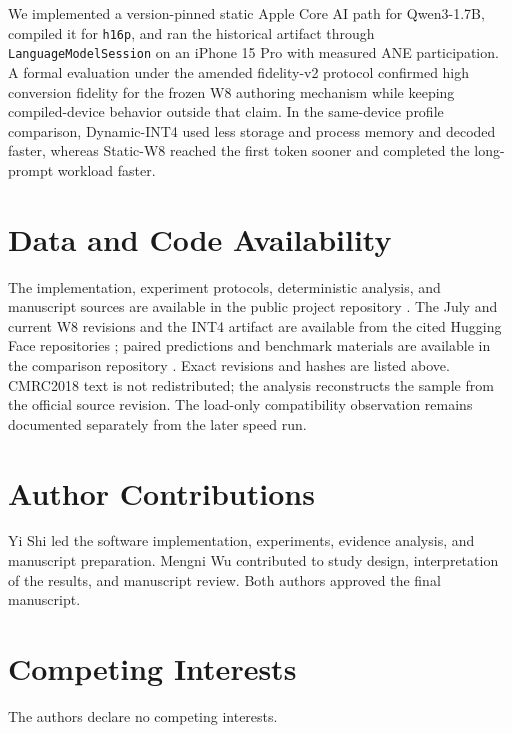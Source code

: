 \documentclass[10pt]{article}
\DeclareRobustCommand{\evidence}[1]{}
\DeclareRobustCommand{\artifact}[1]{\nolinkurl{#1}}
\begin{document}
We implemented a version-pinned static Apple Core AI path for Qwen3-1.7B, compiled it for \artifact{h16p}, and ran the historical artifact through \artifact{LanguageModelSession} on an iPhone 15 Pro with measured ANE participation.\evidence{CL-04,CL-05,CL-08,CL-09,CL-10} A formal evaluation under the amended fidelity-v2 protocol confirmed high conversion fidelity for the frozen W8 authoring mechanism while keeping compiled-device behavior outside that claim.\evidence{CL-07} In the same-device profile comparison, Dynamic-INT4 used less storage and process memory and decoded faster, whereas Static-W8 reached the first token sooner and completed the long-prompt workload faster.\evidence{CL-15,CL-16,CL-17,CL-18,CL-19,CL-20}

\section{Data and Code Availability}

The implementation, experiment protocols, deterministic analysis, and manuscript sources are available in the public project repository \citep{massifW8Repository2026}. The July and current W8 revisions and the INT4 artifact are available from the cited Hugging Face repositories \citep{massifW8JulyArtifact2026,massifW8Artifact2026,massifINT4Artifact2026}; paired predictions and benchmark materials are available in the comparison repository \citep{massifComparison2026}. Exact revisions and hashes are listed above. CMRC2018 text is not redistributed; the analysis reconstructs the sample from the official source revision. The load-only compatibility observation remains documented separately from the later speed run.\evidence{CL-28}

\section{Author Contributions}

Yi Shi led the software implementation, experiments, evidence analysis, and manuscript preparation. Mengni Wu contributed to study design, interpretation of the results, and manuscript review. Both authors approved the final manuscript.

\section{Competing Interests}

The authors declare no competing interests.
\end{document}
